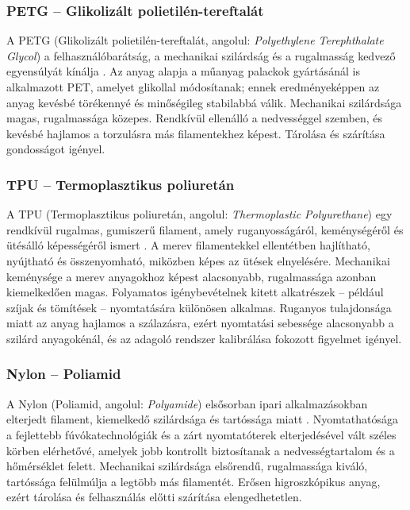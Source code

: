         \subsubsection{PETG – Glikolizált polietilén-tereftalát}

        A PETG (Glikolizált polietilén-tereftalát, angolul: \textit{Polyethylene Terephthalate Glycol}) a felhasználóbarátság, a mechanikai szilárdság és a rugalmasság kedvező egyensúlyát kínálja \cite{all3dp_filaments}. Az anyag alapja a műanyag palackok gyártásánál is alkalmazott PET, amelyet glikollal módosítanak; ennek eredményeképpen az anyag kevésbé törékennyé és minőségileg stabilabbá válik. Mechanikai szilárdsága magas, rugalmassága közepes. Rendkívül ellenálló a nedvességgel szemben, és kevésbé hajlamos a torzulásra más filamentekhez képest. Tárolása és szárítása gondosságot igényel.

        \subsubsection{TPU – Termoplasztikus poliuretán}

        A TPU (Termoplasztikus poliuretán, angolul: \textit{Thermoplastic Polyurethane}) egy rendkívül rugalmas, gumiszerű filament, amely ruganyosságáról, keménységéről és ütésálló képességéről ismert \cite{all3dp_filaments}. A merev filamentekkel ellentétben hajlítható, nyújtható és összenyomható, miközben képes az ütések elnyelésére. Mechanikai keménysége a merev anyagokhoz képest alacsonyabb, rugalmassága azonban kiemelkedően magas. Folyamatos igénybevételnek kitett alkatrészek – például szíjak és tömítések – nyomtatására különösen alkalmas. Ruganyos tulajdonsága miatt az anyag hajlamos a szálazásra, ezért nyomtatási sebessége alacsonyabb a szilárd anyagokénál, és az adagoló rendszer kalibrálása fokozott figyelmet igényel.

        \subsubsection{Nylon – Poliamid}

        A Nylon (Poliamid, angolul: \textit{Polyamide}) elsősorban ipari alkalmazásokban elterjedt filament, kiemelkedő szilárdsága és tartóssága miatt \cite{all3dp_filaments}. Nyomtathatósága a fejlettebb fúvókatechnológiák és a zárt nyomtatóterek elterjedésével vált széles körben elérhetővé, amelyek jobb kontrollt biztosítanak a nedvességtartalom és a hőmérséklet felett. Mechanikai szilárdsága elsőrendű, rugalmassága kiváló, tartóssága felülmúlja a legtöbb más filamentét. Erősen higroszkópikus anyag, ezért tárolása és felhasználás előtti szárítása elengedhetetlen.

